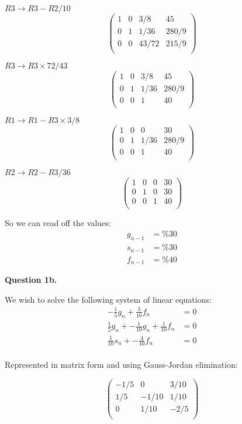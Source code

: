 \documentclass[12pt,a4paper]{report}
\begin{document}
\(R3 \rightarrow R3 - R2 / 10 \)
  \[
 \left(\begin{array}{rrr|r}
 1 & 0 & 3/8 & 45   \\
 0 & 1 & 1/36 & 280/9  \\
 0 & 0 & 43/72 & 215/9  \\
   \end{array} \right)
\]
 
\(R3 \rightarrow R3 \times 72/43 \)
  \[
 \left(\begin{array}{rrr|r}
 1 & 0 & 3/8 & 45   \\
 0 & 1 & 1/36 & 280/9  \\
 0 & 0 & 1 & 40   \\
   \end{array} \right)
\]
 
\(R1 \rightarrow R1 - R3 \times 3/8 \)
  \[
 \left(\begin{array}{rrr|r}
 1 & 0 & 0 & 30   \\
 0 & 1 & 1/36 & 280/9  \\
 0 & 0 & 1 & 40   \\
   \end{array} \right)
\]
 
\(R2 \rightarrow R2 - R3 / 36 \)
  \[
 \left(\begin{array}{rrr|r}
 1 & 0 & 0 & 30   \\
 0 & 1 & 0 & 30   \\
 0 & 0 & 1 & 40   \\
   \end{array} \right)
\]

So we can read off the values:
\begin{align*}
 g_{n-1} &= \%30 \\
 s_{n-1} &= \%30 \\
 f_{n-1} &= \%40
\end{align*} 

\textbf{Question 1b.}

We wish to solve the following system of linear equations:
\begin{align*}
-\frac{1}{5}g_n + \frac{3}{10}f_n &= 0\\
\frac{1}{5}g_n + -\frac{1}{10}g_n + \frac{1}{10}f_n &= 0 \\
\frac{1}{10}s_n + -\frac{4}{10}f_n &= 0 \\
\end{align*} 

Represented in matrix form and using Gauss-Jordan elimination:

 \[
 \left(\begin{array}{rrr}
 -1/5 & 0 & 3/10     \\
 1/5 & -1/10 & 1/10 \\
 0 & 1/10 & -2/5  \\
    \end{array} \right)
\]
\end{document}
